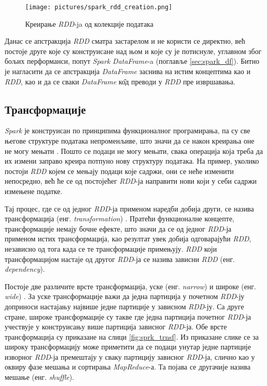 \documentclass[12pt,oneside]{memoir}
\begin{document}
\begin{figure}[!ht]
  \centering
  \texttt{[image: pictures/spark\_rdd\_creation.png]}
  \caption{Креирање \textit{RDD}-ja од колекције података}
  \label{fig:spark_rdd_creation_png}
\end{figure}

Данас се апстракција \textit{RDD} сматра застарелом и не користи се директно, већ постоје друге које су конструисане над њом и које су је потиснуле, углавном због бољих перформанси, попут \textit{Spark DataFrame}-a (поглавље \ref{sec:spark_df}). Битно је нагласити да се апстракција \textit{DataFrame} заснива на истим концептима као и \textit{RDD}, као и да се сваки \textit{DataFrame} к\^{о}д преводи у \textit{RDD} пре извршавања.

\subsection{Трансформације}
\label{subsec:spark_transf}

\textit{Spark} је конструисан по принципима функционалног програмирања, па су све његове структуре података непроменљиве, што значи да се након креирања оне не могу мењати \cite{spark_guide}. Пошто се подаци не могу мењати, свака операција која треба да их измени заправо креира потпуно нову структуру података. На пример, уколико постоји \textit{RDD} којем се мењају подаци које садржи, они се неће изменити непосредно, већ ће се од постојећег \textit{RDD}-ја направити нови који у себи садржи измењене податке.

Тај процес, где се од једног \textit{RDD}-ја применом наредби добија други, се назива трансформација (енг. \textit{transformation})  \cite{spark_guide}. Пратећи функционалне концепте, трансформације немају бочне ефекте, што значи да се од једног \textit{RDD}-ја применом истих трансформација, као резултат увек добија одговарајући \textit{RDD}, независно од тога када се те трансформације примењују. \textit{RDD} који трансформацијом настаје од другог \textit{RDD}-ја се назива зависни \textit{RDD} (енг. \textit{dependency}).

Постоје две различите врсте трансформација, уске (енг. \textit{narrow}) и широке (енг. \textit{wide}) \cite{spark_guide}. За уске трансформације важи да једна партиција у почетном \textit{RDD}-ју доприноси настајању највише једне партиције у зависном \textit{RDD}-ју. Са друге стране, широке трансформације су такве где једна партиција почетног \textit{RDD}-ја учествује у конструисању више партиција зависног \textit{RDD}-ја. Обе врсте трансформација су приказане на слици \ref{fig:sprk_trnsf}. Из приказане слике се за широку трансформацију може приметити да се подаци унутар једне партиције изворног \textit{RDD}-ја премештају у сваку партицију зависног \textit{RDD}-ја, слично као у оквиру фазе мешања и сортирања \textit{MapReduce}-а. Та појава се другачије назива мешање (енг. \textit{shuffle}).
\end{document}
